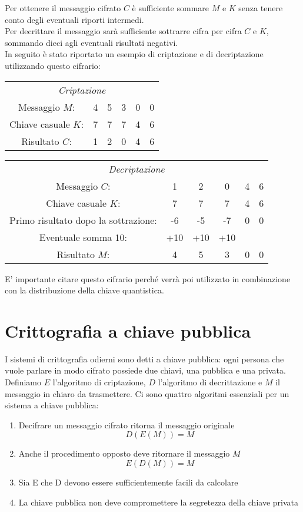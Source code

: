 \documentclass[italian,A4,12pt]{article}
\begin{document}
    Per ottenere il messaggio cifrato $C$ è sufficiente sommare $M$ e $K$ senza tenere conto degli eventuali riporti intermedi.\\
    Per decrittare il messaggio sarà sufficiente sottrarre cifra per cifra $C$ e $K$, sommando dieci agli eventuali risultati negativi.\\
    In seguito è stato riportato un esempio di criptazione e di decriptazione utilizzando questo cifrario:
    \begin{center}
      \begin{tabular}{c c c c c c}
        \multicolumn{6}{c}{\textit{Criptazione}}\\
        Messaggio $M$:&4&5&3&0&0\\
        Chiave casuale $K$:&7&7&7&4&6\\
        \hline
        Risultato $C$: & 1&2&0&4&6\\
      \end{tabular}
    \end{center}
    \begin{center}
      \begin{tabular}{c c c c c c}
        \multicolumn{6}{c}{\textit{Decriptazione}}\\
        Messaggio $C$:&1&2&0&4&6\\
        Chiave casuale $K$:&7&7&7&4&6\\
        Primo risultato dopo la sottrazione:&-6&-5&-7&0&0\\
        Eventuale somma 10:&+10&+10&+10\\
        \hline
        Risultato $M$: & 4&5&3&0&0\\
      \end{tabular}
    \end{center}
    E' importante citare questo cifrario perché verrà poi utilizzato in combinazione con la distribuzione della chiave quantistica.\\
    \newpage
  \section{Crittografia a chiave pubblica}
    I sistemi di crittografia odierni sono detti a chiave pubblica: ogni persona che vuole parlare in modo cifrato possiede due chiavi, una pubblica e una privata.\\
    Definiamo $E$ l'algoritmo di criptazione, $D$ l'algoritmo di decrittazione e $M$ il messaggio in chiaro da trasmettere. Ci sono quattro algoritmi essenziali per un sistema a chiave pubblica:
    \begin{enumerate}[label=(\alph*)]
      \item Decifrare un messaggio cifrato ritorna il messaggio originale $$D(E(M))=M$$
      \item Anche il procedimento opposto deve ritornare il messaggio $M$ $$E(D(M))=M$$
      \item Sia E che D devono essere sufficientemente facili da calcolare
      \item La chiave pubblica non deve compromettere la segretezza della chiave privata
    \end{enumerate}
\end{document}
